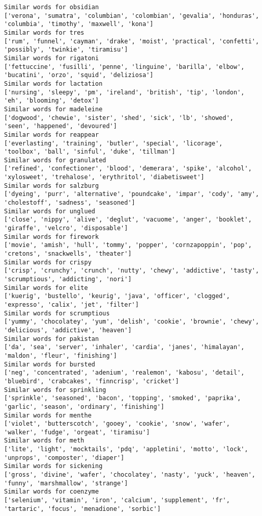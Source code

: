 \documentclass[11pt]{article}
\begin{document}
\begin{Verbatim}[commandchars=\\\{\}]
Similar words for obsidian
['verona', 'sumatra', 'columbian', 'colombian', 'gevalia', 'honduras', 'columbia', 'timothy', 'maxwell', 'kona']
Similar words for tres
['rum', 'funnel', 'cayman', 'drake', 'moist', 'practical', 'confetti', 'possibly', 'twinkie', 'tiramisu']
Similar words for rigatoni
['fettuccine', 'fusilli', 'penne', 'linguine', 'barilla', 'elbow', 'bucatini', 'orzo', 'squid', 'deliziosa']
Similar words for lactation
['nursing', 'sleepy', 'pm', 'ireland', 'british', 'tip', 'london', 'eh', 'blooming', 'detox']
Similar words for madeleine
['dogwood', 'chewie', 'sister', 'shed', 'sick', 'lb', 'showed', 'seen', 'happened', 'devoured']
Similar words for reappear
['everlasting', 'training', 'butler', 'special', 'licorage', 'toolbox', 'ball', 'sinful', 'duke', 'tillman']
Similar words for granulated
['refined', 'confectioner', 'blood', 'demerara', 'spike', 'alcohol', 'xylosweet', 'trehalose', 'erythritol', 'diabetisweet']
Similar words for salzburg
['dyeing', 'purr', 'alternative', 'poundcake', 'impar', 'cody', 'amy', 'cholestoff', 'sadness', 'seasoned']
Similar words for unglued
['close', 'nippy', 'alive', 'deglut', 'vacuome', 'anger', 'booklet', 'giraffe', 'velcro', 'disposable']
Similar words for firework
['movie', 'amish', 'hull', 'tommy', 'popper', 'cornzapoppin', 'pop', 'cretons', 'snackwells', 'theater']
Similar words for crispy
['crisp', 'crunchy', 'crunch', 'nutty', 'chewy', 'addictive', 'tasty', 'scrumptious', 'addicting', 'nori']
Similar words for elite
['kuerig', 'bustello', 'keurig', 'java', 'officer', 'clogged', 'expresso', 'calix', 'jet', 'filter']
Similar words for scrumptious
['yummy', 'chocolatey', 'yum', 'delish', 'cookie', 'brownie', 'chewy', 'delicious', 'addictive', 'heaven']
Similar words for pakistan
['da', 'sea', 'server', 'inhaler', 'cardia', 'janes', 'himalayan', 'maldon', 'fleur', 'finishing']
Similar words for bursted
['neg', 'concentrated', 'adenium', 'realemon', 'kabosu', 'detail', 'bluebird', 'crabcakes', 'finncrisp', 'cricket']
Similar words for sprinkling
['sprinkle', 'seasoned', 'bacon', 'topping', 'smoked', 'paprika', 'garlic', 'season', 'ordinary', 'finishing']
Similar words for menthe
['violet', 'butterscotch', 'gooey', 'cookie', 'snow', 'wafer', 'walker', 'fudge', 'orgeat', 'tiramisu']
Similar words for meth
['lite', 'light', 'mocktails', 'pdq', 'appletini', 'motto', 'lock', 'unprops', 'composter', 'diaper']
Similar words for sickening
['gross', 'divine', 'wafer', 'chocolatey', 'nasty', 'yuck', 'heaven', 'funny', 'marshmallow', 'strange']
Similar words for coenzyme
['selenium', 'vitamin', 'iron', 'calcium', 'supplement', 'fr', 'tartaric', 'focus', 'menadione', 'sorbic']

\end{Verbatim}
\end{document}
